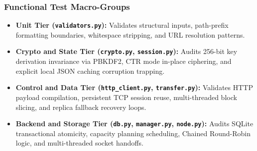 \subsubsection{Functional Test Macro-Groups}
\begin{itemize}
    \item \textbf{Unit Tier (\texttt{validators.py}):} Validates structural inputs, path-prefix formatting boundaries, whitespace stripping, and URL resolution patterns.
    \item \textbf{Crypto and State Tier (\texttt{crypto.py}, \texttt{session.py}):} Audits 256-bit key derivation invariance via PBKDF2, CTR mode in-place ciphering, and explicit local JSON caching corruption trapping.
    \item \textbf{Control and Data Tier (\texttt{http\_client.py}, \texttt{transfer.py}):} Validates HTTP payload compilation, persistent TCP session reuse, multi-threaded block slicing, and replica fallback recovery loops.
    \item \textbf{Backend and Storage Tier (\texttt{db.py}, \texttt{manager.py}, \texttt{node.py}):} Audits SQLite transactional atomicity, capacity planning scheduling, Chained Round-Robin logic, and multi-threaded socket handoffs.
\end{itemize}

